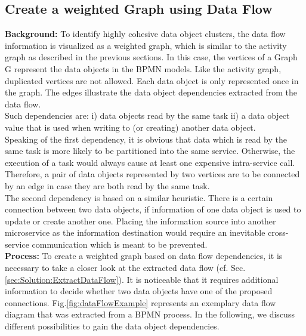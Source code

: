 \subsection{Create a weighted Graph using Data Flow}
\label{sec:Solution:CreateGraphData}
\textbf{Background:} To identify highly cohesive data object clusters, the data flow information is visualized as a weighted graph, which is similar to the activity graph as described in the previous sections. In this case, the vertices of a Graph G represent the data objects in the BPMN models. Like the activity graph, duplicated vertices are not allowed. Each data object is only represented once in the graph. The edges illustrate the data object dependencies extracted from the data flow. \\
Such dependencies are: i) data objects read by the same task ii) a data object value that is used when writing to (or creating) another data object. \\
Speaking of the first dependency, it is obvious that data which is read by the same task is more likely to be partitioned into the same service. Otherwise, the execution of a task would always cause at least one expensive intra-service call.
Therefore, a pair of data objects represented by two vertices are to be connected by an edge in case they are both read by the same task.\\
The second dependency is based on a similar heuristic. There is a certain connection between two data objects, if information of one data object is used to update or create another one. Placing the information source into another microservice as the information destination would require an inevitable cross-service communication which is meant to be prevented. \\

\noindent
\textbf{Process:} To create a weighted graph based on data flow dependencies, it is necessary to take a closer look at the extracted data flow (cf. Sec.\ref{sec:Solution:ExtractDataFlow}). It is noticeable that it requires additional information to decide whether two data objects have one of the proposed connections. Fig.\ref{fig:dataFlowExample} represents an exemplary data flow diagram that was extracted from a BPMN process. In the following, we discuss different possibilities to gain the data object dependencies.


